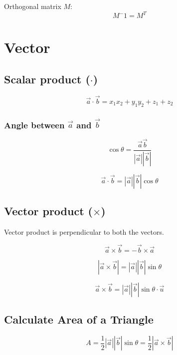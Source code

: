\documentclass[a4paper,9pt]{scrartcl}
\newcommand{\vecabs}[1]{\left| \vec{#1} \right|}
\newcommand{\abs}[1]{\left| #1 \right|}
\begin{document}
    Orthogonal matrix $M$:
    \begin{displaymath}
        M^-1 = M^T
    \end{displaymath}


    \section{Vector}

    \subsection{Scalar product ($\cdot$)}
    \begin{displaymath}
        \vec{a}\cdot\vec{b}= x_1 x_2 + y_1 y_2 + z_1 + z_2
    \end{displaymath}

    \subsubsection{Angle between $\vec{a}$ and $\vec{b}$}
    \begin{displaymath}
        \cos\theta = \frac{\vec{a}\vec{b}}{\vecabs{a}\vecabs{b}}
    \end{displaymath}

    \begin{displaymath}
        \vec{a}\cdot\vec{b} = \vecabs{a}\vecabs{b}\cos\theta
    \end{displaymath}

    \subsection{Vector product ($\times$)}
    Vector product is perpendicular to both the vectors.

    \begin{displaymath}
        \vec{a}\times\vec{b} = -\vec{b}\times\vec{a}
    \end{displaymath}

    \begin{displaymath}
        \abs{\vec{a}\times\vec{b}} = \vecabs{a}\vecabs{b}\sin\theta
    \end{displaymath}

    \begin{displaymath}
        \vec{a}\times\vec{b} = \vecabs{a}\vecabs{b}\sin\theta\cdot\vec{u}
    \end{displaymath}

    \subsection{Calculate Area of a Triangle}
    \begin{displaymath}
        A = \frac{1}{2}\vecabs{a}\vecabs{b}\sin\theta = \frac{1}{2}\abs{\vec{a}\times\vec{b}}
    \end{displaymath}
\end{document}
